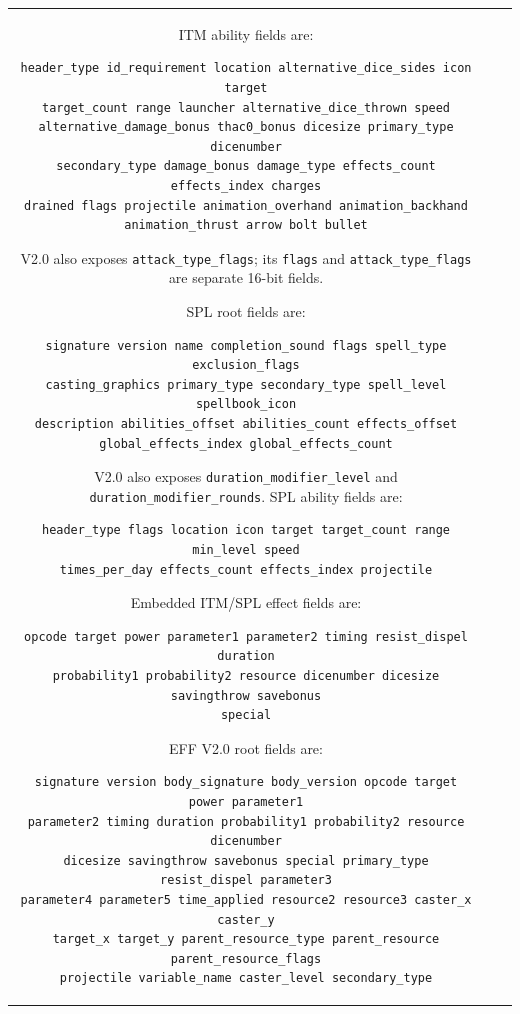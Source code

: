 \documentclass{article}
\def\t#1{{\tt #1}}
\begin{document}
\begin{tabular}{cp{10in}|p{10in}}
    ITM ability fields are:
\begin{verbatim}
header_type id_requirement location alternative_dice_sides icon target
target_count range launcher alternative_dice_thrown speed
alternative_damage_bonus thac0_bonus dicesize primary_type dicenumber
secondary_type damage_bonus damage_type effects_count effects_index charges
drained flags projectile animation_overhand animation_backhand
animation_thrust arrow bolt bullet
\end{verbatim}
    V2.0 also exposes \t{attack_type_flags}; its \t{flags} and
    \t{attack_type_flags} are separate 16-bit fields.

    SPL root fields are:
\begin{verbatim}
signature version name completion_sound flags spell_type exclusion_flags
casting_graphics primary_type secondary_type spell_level spellbook_icon
description abilities_offset abilities_count effects_offset
global_effects_index global_effects_count
\end{verbatim}
    V2.0 also exposes \t{duration_modifier_level} and
    \t{duration_modifier_rounds}. SPL ability fields are:
\begin{verbatim}
header_type flags location icon target target_count range min_level speed
times_per_day effects_count effects_index projectile
\end{verbatim}

    Embedded ITM/SPL effect fields are:
\begin{verbatim}
opcode target power parameter1 parameter2 timing resist_dispel duration
probability1 probability2 resource dicenumber dicesize savingthrow savebonus
special
\end{verbatim}

    EFF V2.0 root fields are:
\begin{verbatim}
signature version body_signature body_version opcode target power parameter1
parameter2 timing duration probability1 probability2 resource dicenumber
dicesize savingthrow savebonus special primary_type resist_dispel parameter3
parameter4 parameter5 time_applied resource2 resource3 caster_x caster_y
target_x target_y parent_resource_type parent_resource parent_resource_flags
projectile variable_name caster_level secondary_type
\end{verbatim}


\end{tabular}
\end{document}
